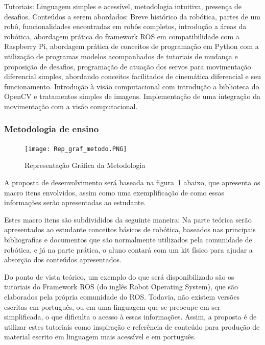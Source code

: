 Tutoriais: Linguagem simples e acessível, metodologia intuitiva, presença de desafios.
Conteúdos a serem abordados: Breve histórico da robótica, partes de um robô, funcionalidades encontradas em robôs completos, introdução a áreas da robótica, abordagem prática do framework ROS em compatibilidade com a Raspberry Pi, abordagem prática de conceitos de programação em Python com a utilização de programas modelos acompanhados de tutoriais de mudança e proposição de desafios,
programação de atuação dos servos para movimentação diferencial simples, abordando conceitos facilitados de cinemática diferencial e seu funcionamento. Introdução à visão computacional com introdução a biblioteca do OpenCV e tratamentos simples de imagens.
Implementação de uma integração da movimentação com a visão computacional.

\subsubsection{Metodologia de ensino}

\begin{figure}[h!]                                                
	\centering        
	\texttt{[image: Rep\_graf\_metodo.PNG]}            
	\caption{Representação Gráfica da Metodologia}        
	\label{img:rep_metod}    
\end{figure}

A proposta de desenvolvimento será baseada na figura~\ref{img:rep_metod} abaixo, que apresenta os macro itens envolvidos, assim como uma exemplificação de como essas informações serão apresentadas ao estudante.

Estes macro itens são subdivididos da seguinte maneira: Na parte teórica serão apresentados ao estudante conceitos básicos de robótica, baseados nas principais bibliografias e documentos que são normalmente utilizados pela comunidade de robótica, e já na parte prática, o aluno contará com um kit físico para ajudar a absorção dos conteúdos apresentados.

Do ponto de vista teórico, um exemplo do que será disponibilizado são os tutoriais do Framework ROS (do inglês Robot Operating System), que são elaborados pela própria comunidade do ROS. Todavia, não existem versões escritas em português, ou em uma linguagem que se preocupe em ser simplificada, o que dificulta o acesso à essas informações. Assim, a proposta é de utilizar estes tutoriais como inspiração e referência de conteúdo para produção de material escrito em linguagem mais acessível e em português.

